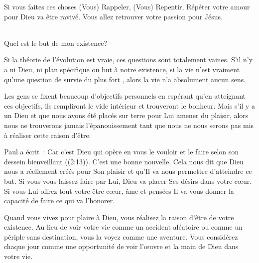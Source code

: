 Si vous faites ces choses
 \ocadr (Vous) Rappeler, (Vous) Repentir, Répéter \fcadr{}
 votre amour pour Dieu va être ravivé.
 Vous allez retrouver votre passion pour Jésus. 

\dvrule






\\
 Quel est le but de mon existence?

Si la théorie de l'évolution est vraie, ces questions sont totalement vaines.
 S'il n'y a ni Dieu, ni plan spécifique ou but à notre existence,
 si la vie n'est vraiment qu'une question de \og survie du plus fort \fg{},
 alors la vie n'a absolument aucun sens. 

Les gens se fixent beaucoup d'objectifs personnels en espérant
 qu'en atteignant ces objectifs, ils rempliront le vide intérieur
 et trouveront le bonheur. Mais s'il y a un Dieu et que nous avons
 été placés sur terre pour Lui amener du plaisir,
 alors nous ne trouverons jamais l'épanouissement
 tant que nous ne nous serons pas mis à réaliser cette raison d'être. 


Paul a écrit~: 
 \og Car c'est Dieu qui opère en vous le vouloir et le faire
 selon son dessein bienveillant \fg{} ((2:13)).
 C'est une bonne nouvelle. Cela nous dit que Dieu nous a réellement
 créés pour Son plaisir \ocadr et qu'Il va nous permettre d'atteindre ce but.
 Si vous vous laissez faire par Lui, Dieu va placer Ses désirs
 dans votre cœur. Si vous Lui offrez tout votre être
 \ocadr cœur, âme et pensées \fcadr{} Il va vous donner la capacité
 de faire ce qui va l'honorer. 

Quand vous vivez pour plaire à Dieu, vous réalisez la raison d'être
 de votre existence. Au lieu de voir votre vie comme un accident aléatoire
 ou comme un périple sans destination, vous la voyez comme une aventure.
 Vous considérez chaque jour comme une opportunité de voir l'œuvre
 et la main de Dieu dans votre vie. 

